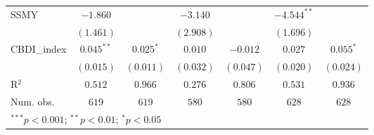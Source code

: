 \begin{table}
\begin{center}
\begin{tabular}{l c c c c c c}
SSMY                & $-1.860$       &                & $-3.140$       &              & $-4.544^{**}$  &               \\
                    & $(1.461)$      &                & $(2.908)$      &              & $(1.696)$      &               \\
CBDI\_index         & $0.045^{**}$   & $0.025^{*}$    & $0.010$        & $-0.012$     & $0.027$        & $0.055^{*}$   \\
                    & $(0.015)$      & $(0.011)$      & $(0.032)$      & $(0.047)$    & $(0.020)$      & $(0.024)$     \\
\hline
R$^2$               & $0.512$        & $0.966$        & $0.276$        & $0.806$      & $0.531$        & $0.936$       \\
Num. obs.           & $619$          & $619$          & $580$          & $580$        & $628$          & $628$         \\
\hline
\multicolumn{7}{l}{\scriptsize{$^{***}p<0.001$; $^{**}p<0.01$; $^{*}p<0.05$}}
\end{tabular}
\label{FGLS}
\end{center}
\end{table}
